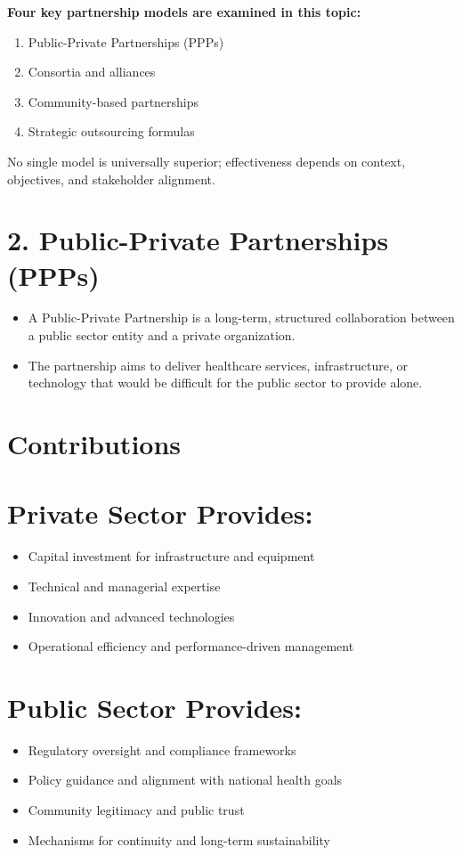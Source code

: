 \documentclass[10pt]{article}
\begin{document}
\textbf{Four key partnership models are examined in this topic:}

\begin{enumerate}
  \item Public-Private Partnerships (PPPs)
  \item Consortia and alliances
  \item Community-based partnerships
  \item Strategic outsourcing formulas
\end{enumerate}


No single model is universally superior; effectiveness depends on context, objectives, and stakeholder alignment.

\section*{2. Public-Private Partnerships (PPPs)}
\begin{itemize}
  \item A Public-Private Partnership is a long-term, structured collaboration between a public sector entity and a private organization.
  \item The partnership aims to deliver healthcare services, infrastructure, or technology that would be difficult for the public sector to provide alone.
\end{itemize}

\section*{Contributions}
\section*{Private Sector Provides:}
\begin{itemize}
  \item Capital investment for infrastructure and equipment
  \item Technical and managerial expertise
  \item Innovation and advanced technologies
  \item Operational efficiency and performance-driven management
\end{itemize}

\section*{Public Sector Provides:}
\begin{itemize}
  \item Regulatory oversight and compliance frameworks
  \item Policy guidance and alignment with national health goals
  \item Community legitimacy and public trust
  \item Mechanisms for continuity and long-term sustainability
\end{itemize}
\end{document}
